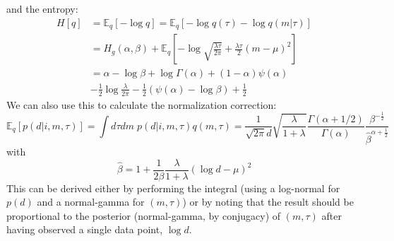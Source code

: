 \documentclass[11pt]{article}
\begin{document}
and the entropy:
\begin{align}
    H[q] &= \mathbb{E}_q[-\log q] = \mathbb{E}_q[-\log q(\tau) - \log q(m|\tau)] \\
    &= H_g(\alpha, \beta) + \mathbb{E}_q\left[
    -\log \sqrt{\frac{\lambda\tau}{2\pi}} +
    \frac{\lambda\tau}{2} (m - \mu)^2
    \right] \\
    &= \alpha - \log \beta + \log \Gamma(\alpha) + (1 - \alpha) \psi(\alpha) \\
    & - \frac{1}{2} \log \frac{\lambda}{2\pi} - \frac{1}{2} \left(\psi(\alpha) - \log \beta\right)
    + \frac{1}{2}
\end{align}
We can also use this to calculate the normalization correction:
\begin{equation}
    \mathbb{E}_q[p(d|i, m, \tau)] = \int d\tau dm \; p(d|i, m, \tau) q(m, \tau)
    = \frac{1}{\sqrt{2\pi}d} \sqrt{\frac{\lambda}{1 + \lambda}}
    \frac{\Gamma(\alpha + 1/2)}{\Gamma(\alpha)}
    \frac{\beta^{-\frac{1}{2}}}{\hat{\beta}^{\alpha + \frac{1}{2}}}
\end{equation}
with
\begin{equation}
    \hat{\beta} = 1 + \frac{1}{2\beta} \frac{\lambda}{1 + \lambda}
    (\log d - \mu)^2
\end{equation}
This can be derived either by performing the integral (using a log-normal for $p(d)$ and a normal-gamma for $(m, \tau)$) or by noting that the result should be proportional to the posterior (normal-gamma, by conjugacy) of $(m, \tau)$ after having observed a single data point, $\log d$.
\end{document}

